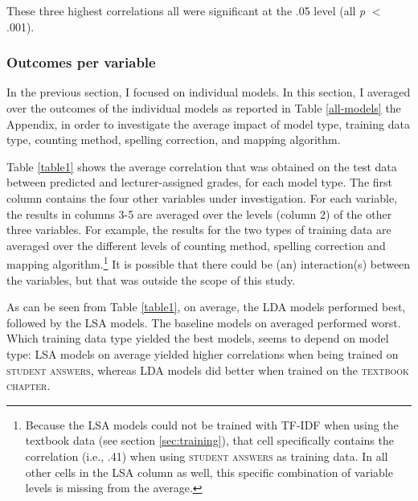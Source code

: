 \documentclass[a4paper,10pt,twoside]{article}
\begin{document}
These three highest correlations all were significant at the .05 level (all \textit{p} $<$ .001).

\subsubsection{Outcomes per variable}
In the previous section, I focused on individual models. In this section, I averaged over the outcomes of the individual models as reported in Table \ref{all-models} the Appendix, in order to investigate the average impact of model type, training data type, counting method, spelling correction, and mapping algorithm. 

Table \ref{table1} shows the average correlation that was obtained on the test data between predicted and lecturer-assigned grades, for each model type. The first column contains the four other variables under investigation. For each variable, the results in columns 3-5 are averaged over the levels (column 2) of the other three variables. For example, the results for the two types of training data are averaged over the different levels of counting method, spelling correction and mapping algorithm.\footnote{Because the LSA models could not be trained with TF-IDF when using the textbook data (see section \ref{sec:training}), that cell specifically contains the correlation (i.e., .41) when using \textsc{student answers} as training data. In all other cells in the LSA column as well, this specific combination of variable levels is missing from the average.} It is possible that there could be (an) interaction(s) between the variables, but that was outside the scope of this study.

As can be seen from Table \ref{table1}, on average, the LDA models performed best, followed by the LSA models. The baseline models on averaged performed worst. Which training data type yielded the best models, seems to depend on model type: LSA models on average yielded higher correlations when being trained on \textsc{student answers}, whereas LDA models did better when trained on the \textsc{textbook chapter}.
\end{document}

